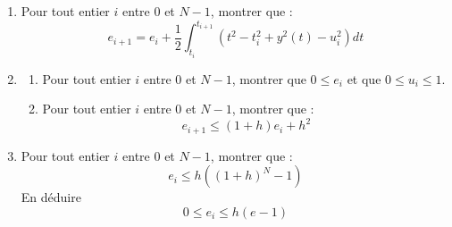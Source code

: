 \begin{enumerate}
\item Pour tout entier $i$ entre $0$ et $N-1$, montrer que :
\begin{displaymath}
 e_{i+1} = e_i +\frac{1}{2}\int_{t_i}^{t_{i+1}}\left(t^2 - t_i^2 +y^2(t) - u_i^2 \right) dt
\end{displaymath}
\item \begin{enumerate}
 \item Pour tout entier $i$ entre $0$ et $N-1$, montrer que $0\leq e_i$ et que $0\leq u_i \leq 1$.
\item Pour tout entier $i$ entre $0$ et $N-1$, montrer que :
\begin{displaymath}
 e_{i+1} \leq (1+h)e_i + h^2
\end{displaymath}
\end{enumerate}

\item Pour tout entier $i$ entre $0$ et $N-1$, montrer que :
\begin{displaymath}
 e_i \leq h\left( (1+h)^N - 1\right) 
\end{displaymath}
En déduire
\begin{displaymath}
 0\leq e_i \leq h(e-1)
\end{displaymath}
\end{enumerate}
